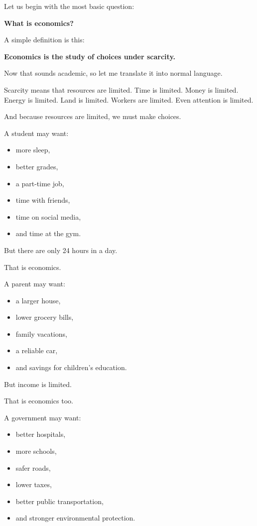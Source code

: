 \documentclass[12pt]{article}
\begin{document}
Let us begin with the most basic question:

\textbf{What is economics?}

A simple definition is this:

\textbf{Economics is the study of choices under scarcity.}

Now that sounds academic, so let me translate it into normal language.

Scarcity means that resources are limited.  
Time is limited.  
Money is limited.  
Energy is limited.  
Land is limited.  
Workers are limited.  
Even attention is limited.

And because resources are limited, we must make choices.

A student may want:
\begin{itemize}[leftmargin=2em]
    \item more sleep,
    \item better grades,
    \item a part-time job,
    \item time with friends,
    \item time on social media,
    \item and time at the gym.
\end{itemize}

But there are only 24 hours in a day.

That is economics.

A parent may want:
\begin{itemize}[leftmargin=2em]
    \item a larger house,
    \item lower grocery bills,
    \item family vacations,
    \item a reliable car,
    \item and savings for children’s education.
\end{itemize}

But income is limited.

That is economics too.

A government may want:
\begin{itemize}[leftmargin=2em]
    \item better hospitals,
    \item more schools,
    \item safer roads,
    \item lower taxes,
    \item better public transportation,
    \item and stronger environmental protection.
\end{itemize}
\end{document}
